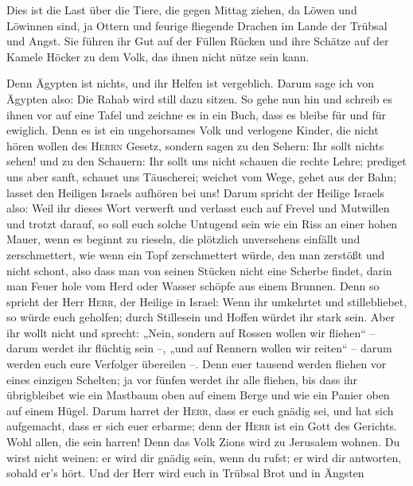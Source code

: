  Dies ist die Last über die Tiere, die gegen Mittag
ziehen, da Löwen und Löwinnen sind, ja Ottern und feurige fliegende
Drachen im Lande der Trübsal und Angst. Sie führen ihr Gut auf der
Füllen Rücken und ihre Schätze auf der Kamele Höcker zu dem Volk, das
ihnen nicht nütze sein kann.

 Denn Ägypten ist nichts, und ihr Helfen ist vergeblich.
Darum sage ich von Ägypten also: Die Rahab wird still dazu sitzen.
 So gehe nun hin und schreib es ihnen vor auf eine Tafel
und zeichne es in ein Buch, dass es bleibe für und für ewiglich.
 Denn es ist ein ungehorsames Volk und verlogene Kinder,
die nicht hören wollen des \textsc{Herrn} Gesetz, 
sondern sagen zu den Sehern: Ihr sollt nichts sehen! und zu den
Schauern: Ihr sollt uns nicht schauen die rechte Lehre; prediget uns
aber sanft, schauet uns Täuscherei;  weichet vom Wege,
gehet aus der Bahn; lasset den Heiligen Israels aufhören bei uns!
 Darum spricht der Heilige Israels also: Weil ihr dieses
Wort verwerft und verlasst euch auf Frevel und Mutwillen und trotzt
darauf,  so soll euch solche Untugend sein wie ein Riss
an einer hohen Mauer, wenn es beginnt zu rieseln, die plötzlich
unversehens einfällt und zerschmettert,  wie wenn ein
Topf zerschmettert würde, den man zerstößt und nicht schont, also dass
man von seinen Stücken nicht eine Scherbe findet, darin man Feuer hole
vom Herd oder Wasser schöpfe aus einem Brunnen.  Denn so
spricht der Herr \textsc{Herr}, der Heilige in Israel: Wenn ihr
umkehrtet und stillebliebet, so würde euch geholfen; durch Stillesein
und Hoffen würdet ihr stark sein. Aber ihr wollt nicht 
und sprecht: „Nein, sondern auf Rossen wollen wir fliehen`` -- darum
werdet ihr flüchtig sein --, „und auf Rennern wollen wir reiten`` --
darum werden euch eure Verfolger übereilen --.  Denn euer
tausend werden fliehen vor eines einzigen Schelten; ja vor fünfen werdet
ihr alle fliehen, bis dass ihr übrigbleibet wie ein Mastbaum oben auf
einem Berge und wie ein Panier oben auf einem Hügel. 
Darum harret der \textsc{Herr}, dass er euch gnädig sei, und hat sich
aufgemacht, dass er sich euer erbarme; denn der \textsc{Herr} ist ein
Gott des Gerichts. Wohl allen, die sein harren!  Denn das
Volk Zions wird zu Jerusalem wohnen. Du wirst nicht weinen: er wird dir
gnädig sein, wenn du rufst; er wird dir antworten, sobald er's hört.
 Und der Herr wird euch in Trübsal Brot und in Ängsten
